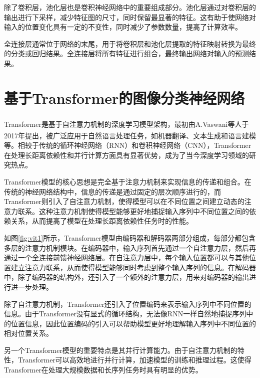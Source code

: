 除了卷积层，池化层也是卷积神经网络中的重要组成部分。池化层通过对卷积层的输出进行下采样，减少特征图的尺寸，同时保留最显著的特征。这有助于使网络对输入的位置变化具有一定的不变性，同时减少了参数数量，提高了计算效率。

全连接层通常位于网络的末尾，用于将卷积层和池化层提取的特征映射转换为最终的分类或回归结果。全连接层将所有特征进行组合，最终输出网络对输入的预测结果。


\section{基于Transformer的图像分类神经网络}
Transformer\textsuperscript{\cite{bengio2013representation}}是基于自注意力机制的深度学习模型架构，最初由A.Vaswani等人于2017年提出\textsuperscript{\cite{vaswani2017attenion}}，被广泛应用于自然语言处理任务，如机器翻译、文本生成和语言建模等。相较于传统的循环神经网络（RNN）和卷积神经网络（CNN），Transformer在处理长距离依赖性和并行计算方面具有显著优势，成为了当今深度学习领域的研究热点。

Transformer模型的核心思想是完全基于注意力机制来实现信息的传递和组合。在传统的神经网络结构中，信息的传递是通过固定的层次顺序进行的，而Transformer则引入了自注意力机制，使得模型可以在不同位置之间建立动态的注意力联系。这种注意力机制使得模型能够更好地捕捉输入序列中不同位置之间的依赖关系，从而提高了模型在处理长距离依赖性任务时的性能。

如图\ref{fig:vit1}所示，Transformer模型由编码器和解码器两部分组成，每部分都包含多层的注意力机制模块。在编码器中，输入序列首先通过一个自注意力层，然后再通过一个全连接前馈神经网络层。在自注意力层中，每个输入位置都可以与其他位置建立注意力联系，从而使得模型能够同时考虑到整个输入序列的信息。在解码器中，除了编码器的结构外，还引入了一个额外的注意力层，用来对编码器的输出进行进一步处理。

除了自注意力机制，Transformer还引入了位置编码来表示输入序列中不同位置的信息。由于Transformer没有显式的循环结构，无法像RNN一样自然地捕捉序列中的位置信息，因此位置编码的引入可以帮助模型更好地理解输入序列中不同位置的相对位置关系。

另一个Transformer模型的重要特点是其并行计算能力。由于自注意力机制的特性，Transformer可以高效地进行并行计算，加速模型的训练和推理过程。这使得Transformer在处理大规模数据和长序列任务时具有明显的优势。


